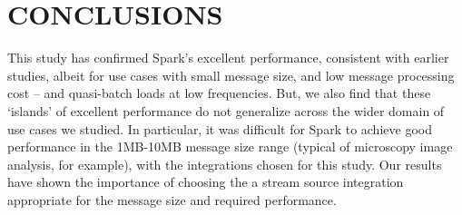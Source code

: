 \documentclass[letterpaper,conference]{IEEEtran}
\begin{document}
\section{CONCLUSIONS}\label{conc}
This study has confirmed Spark's excellent performance, consistent with earlier studies, albeit for use cases with small message size, and low message processing cost -- and quasi-batch loads at low frequencies. But, we also find that these `islands' of excellent performance do not generalize across the wider domain of use cases we studied. In particular, it was difficult for Spark to achieve good performance in the 1MB-10MB message size range (typical of microscopy image analysis, for example), with the integrations chosen for this study. %
Our results have shown the importance of choosing the a stream source integration appropriate for the message size and required performance.
\end{document}
